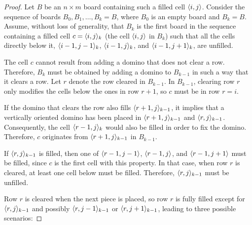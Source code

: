 \begin{proof}  
Let \( B \) be an \( n \times m \) board containing such a filled cell $\cell$. Consider the sequence of boards \( B_0, B_1, \dots, B_k = B \), where \( B_0 \) is an empty board and \( B_k = B \). Assume, without loss of generality, that \( B_k \) is the first board in the sequence containing a filled cell \( c = \cell_k \) (the cell \( \cell \) in \( B_k \)) such that all the cells directly below it, $\cell[i-1][j-1]_k$, $\cell[i-1][j]_k$, and $\cell[i-1][j+1]_k$, are unfilled.  


The cell \( c \) cannot result from adding a domino that does not clear a row. Therefore, \( B_k \) must be obtained by adding a domino to \( B_{k-1} \) in such a way that it clears a row. Let \( r \) denote the row cleared in \( B_{k-1} \). In \( B_{k-1} \), clearing row \( r \) only modifies the cells below the ones in row \( r+1 \), so \( c \) must be in row \( r = i \). 

If the domino that clears the row also fills \( \cell[r+1][j]_{k-1} \), it implies that a vertically oriented domino has been placed in \( \cell[r+1][j]_{k-1} \) and \( \cell[r][j]_{k-1} \). Consequently, the cell \( \cell[r-1][j]_k \) would also be filled in order to fix the domino. Therefore, \( c \) originates from \( \cell[r+1][j]_{k-1} \) in \( B_{k-1} \).

If \( \cell[r][j]_{k-1} \) is filled, then one of \( \cell[r-1][j-1] \), \( \cell[r-1][j] \), and \( \cell[r-1][j+1] \) must be filled, since \( c \) is the first cell with this property. In that case, when row \( r \) is cleared, at least one cell below  must be filled. Therefore, \( \cell[r][j]_{k-1} \) must be unfilled.

Row \( r \) is cleared when the next piece is placed, so row \( r \) is fully filled except for \( \cell[r][j]_{k-1} \) and possibly \( \cell[r][j-1]_{k-1} \) or \( \cell[r][j+1]_{k-1} \), leading to three possible scenarios:


\end{proof}

